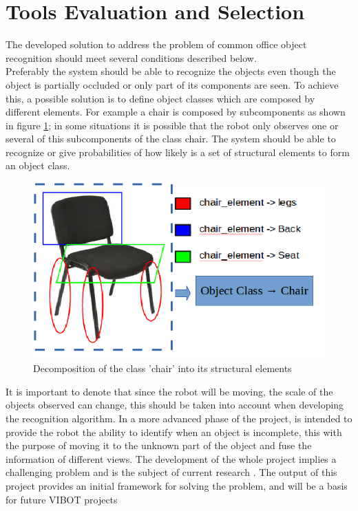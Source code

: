 \documentclass[fontsize=12pt]{article}
\begin{document}
\section{Tools Evaluation and Selection}
 \label{sec:toolseval}
The developed solution to address the problem of common office object recognition should meet several conditions described below.\\
Preferably the system should be able to recognize the objects even though the object is partially occluded or only part of its components are seen. To achieve this, a possible solution is to define object classes which are composed by different elements. For example a chair is composed by subcomponents as shown in figure \ref{fig:chair}; in some situations it is possible that the robot only observes one or several of this subcomponents of the class chair. The system should be able to recognize or give probabilities of how likely is a set of structural elements to form an object class.

\begin{figure}[H]
\begin{center}
\includegraphics[width=0.5\linewidth]{images/chair}
\caption{Decomposition of the class 'chair' into its structural elements}
\label{fig:chair}
\end{center}
\end{figure}
It is important to denote that since the robot will be moving, the scale of the objects observed can change, this should be taken into account when developing the recognition algorithm.
In a more advanced phase of the project, is intended to provide the robot the ability to identify when an object is incomplete, this with the purpose of moving it to the unknown part of the object and fuse the information of different views. 
The development of the whole project implies a challenging problem and is the subject of current research \cite{bib:semantic}. The output of this project provides an initial framework for solving the problem, and will be a basis for future VIBOT projects \\
\end{document}
